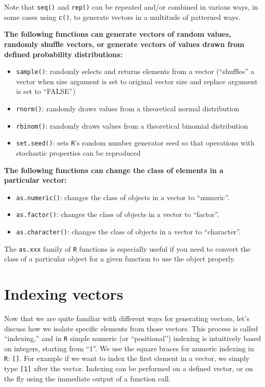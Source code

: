 \documentclass[
]{book}
\begin{document}
Note that \texttt{seq()} and \texttt{rep()} can be repeated and/or combined in various ways, in some cases using \texttt{c()}, to generate vectors in a multitude of patterned ways.

\textbf{The following functions can generate vectors of random values, randomly shuffle vectors, or generate vectors of values drawn from defined probability distributions:}

\begin{itemize}
\item
  \texttt{sample()}: randomly selects and returns elements from a vector (``shuffles'' a vector when size argument is set to original vector size and replace argument is set to ``FALSE'')
\item
  \texttt{rnorm()}: randomly draws values from a theoretical normal distribution
\item
  \texttt{rbinom()}: randomly draws values from a theoretical binomial distribution
\item
  \texttt{set.seed()}: sets \texttt{R}'s random number generator seed so that operations with stochastic properties can be reproduced
\end{itemize}

\textbf{The following functions can change the class of elements in a particular vector:}

\begin{itemize}
\item
  \texttt{as.numeric()}: changes the class of objects in a vector to ``numeric''.
\item
  \texttt{as.factor()}: changes the class of objects in a vector to ``factor''.
\item
  \texttt{as.character()}: changes the class of objects in a vector to ``character''.
\end{itemize}

The \texttt{as.xxx} family of \texttt{R} functions is especially useful if you need to convert the class of a particular object for a given function to use the object properly.

\hypertarget{indexing-vectors}{%
\section{Indexing vectors}\label{indexing-vectors}}

Now that we are quite familiar with different ways for generating vectors, let's discuss how we isolate specific elements from those vectors. This process is called ``indexing,'' and in \texttt{R} simple numeric (or ``positional'') indexing is intuitively based on integers, starting from ``1''. We use the square braces for numeric indexing in \texttt{R}: \texttt{{[}{]}}. For example if we want to index the first element in a vector, we simply type \texttt{{[}1{]}} after the vector. Indexing can be performed on a defined vector, or on the fly using the immediate output of a function call.
\end{document}
